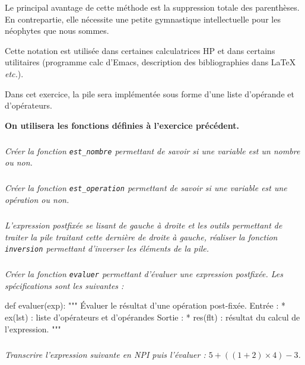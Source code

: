 \begin{rem}
Le principal avantage de cette méthode est la suppression totale des parenthèses. En contrepartie, elle nécessite une petite gymnastique intellectuelle pour les néophytes que nous sommes.

Cette notation est utilisée dans certaines calculatrices HP et dans certains utilitaires (programme calc d'Emacs, description des bibliographies dans LaTeX \textit{etc.}).
\end{rem}

Dans cet exercice, la pile sera implémentée sous forme d'une liste d'opérande et d'opérateurs. 

\textbf{On utilisera les fonctions définies à l'exercice précédent.}
 
\subparagraph{}\textit{Créer la fonction \texttt{est\_nombre} permettant de savoir si une variable est un nombre ou non.}

\subparagraph{}\textit{Créer la fonction \texttt{est\_operation} permettant de savoir si une variable est une opération ou non.}

\subparagraph{}\textit{L'expression postfixée se lisant de gauche à droite et les outils permettant de traiter la pile traitant cette dernière de droite à gauche, réaliser la fonction \texttt{inversion} permettant d'inverser les éléments de la pile.}


\subparagraph{}\textit{Créer la fonction \texttt{evaluer} permettant d'évaluer une expression postfixée. Les spécifications sont les suivantes :}

\begin{py}
\begin{python}
def evaluer(exp):
    """
    Évaluer le résultat d'une opération post-fixée.
    Entrée : 
     * ex(lst) : liste d'opérateurs et d'opérandes
    Sortie : 
     * res(flt) : résultat du calcul de l'expression.
    """
\end{python}
\end{py}

\subparagraph{}
\textit{Transcrire l'expression suivante en NPI puis l'évaluer : $5+\left(\left( 1+2\right)\times4 \right)-3$.}

\fi

\ifprof

